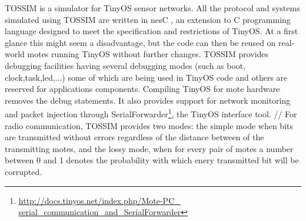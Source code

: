 \label{subsec:tossim}
TOSSIM\cite{tossim} is a simulator for TinyOS sensor networks.
All the protocol and systems simulated using TOSSIM are written in nesC \cite{nesC},
an extension to C programming language designed to meet the specification and 
restrictions of TinyOS. At a first glance this might seem a disadvantage, but 
the code can then be reused on real-world motes running TinyOS
without further changes.
TOSSIM provides debugging facilities having several debugging modes 
(such as boot, clock,task,led,...) some of which are being used in TinyOS code
and others are reserved for applications components. Compiling TinyOS for mote
hardware removes the debug statements.
It also provides support for network monitoring and packet injection
through SerialForwarder\footnote{\url{http://docs.tinyos.net/index.php/Mote-PC_
serial_communication_and_SerialForwarder}}, the TinyOS interface tool.
//
For radio communication, TOSSIM provides two modes: the simple mode when bits
are transmitted without errors regardless of the distance between of the transmitting
motes, and the lossy mode, when for every pair of motes a number between 0 and 1 
denotes the probability with which enery transmitted bit will be corrupted. 

